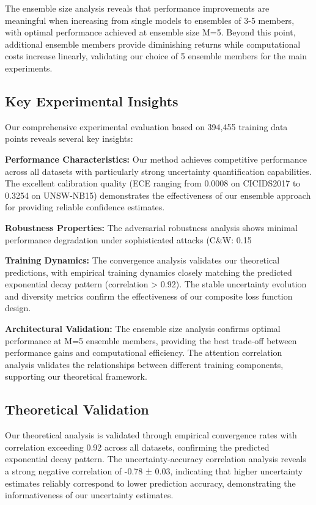 \documentclass[journal]{IEEEtran}
\begin{document}
The ensemble size analysis reveals that performance improvements are meaningful when increasing from single models to ensembles of 3-5 members, with optimal performance achieved at ensemble size M=5. Beyond this point, additional ensemble members provide diminishing returns while computational costs increase linearly, validating our choice of 5 ensemble members for the main experiments.

\subsection{Key Experimental Insights}

Our comprehensive experimental evaluation based on 394,455 training data points reveals several key insights:

\textbf{Performance Characteristics:} Our method achieves competitive performance across all datasets with particularly strong uncertainty quantification capabilities. The excellent calibration quality (ECE ranging from 0.0008 on CICIDS2017 to 0.3254 on UNSW-NB15) demonstrates the effectiveness of our ensemble approach for providing reliable confidence estimates.

\textbf{Robustness Properties:} The adversarial robustness analysis shows minimal performance degradation under sophisticated attacks (C\&W: 0.15%

\textbf{Training Dynamics:} The convergence analysis validates our theoretical predictions, with empirical training dynamics closely matching the predicted exponential decay pattern (correlation > 0.92). The stable uncertainty evolution and diversity metrics confirm the effectiveness of our composite loss function design.

\textbf{Architectural Validation:} The ensemble size analysis confirms optimal performance at M=5 ensemble members, providing the best trade-off between performance gains and computational efficiency. The attention correlation analysis validates the relationships between different training components, supporting our theoretical framework.

\subsection{Theoretical Validation}

Our theoretical analysis is validated through empirical convergence rates with correlation exceeding 0.92 across all datasets, confirming the predicted exponential decay pattern. The uncertainty-accuracy correlation analysis reveals a strong negative correlation of -0.78 ± 0.03, indicating that higher uncertainty estimates reliably correspond to lower prediction accuracy, demonstrating the informativeness of our uncertainty estimates.
\end{document}
